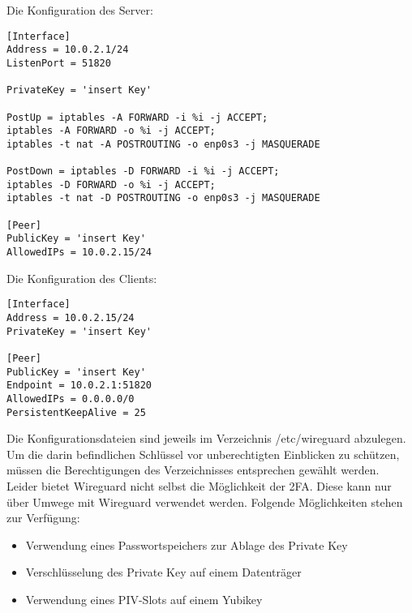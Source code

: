 \noindent Die Konfiguration des Server:
\begin{verbatim}
[Interface]
Address = 10.0.2.1/24
ListenPort = 51820

PrivateKey = 'insert Key'

PostUp = iptables -A FORWARD -i %i -j ACCEPT; 
iptables -A FORWARD -o %i -j ACCEPT; 
iptables -t nat -A POSTROUTING -o enp0s3 -j MASQUERADE

PostDown = iptables -D FORWARD -i %i -j ACCEPT; 
iptables -D FORWARD -o %i -j ACCEPT; 
iptables -t nat -D POSTROUTING -o enp0s3 -j MASQUERADE

[Peer]  
PublicKey = 'insert Key'
AllowedIPs = 10.0.2.15/24
\end{verbatim}
\vspace{0.5cm}
\noindent Die Konfiguration des Clients:
\begin{verbatim}
[Interface]
Address = 10.0.2.15/24
PrivateKey = 'insert Key'

[Peer]  
PublicKey = 'insert Key'
Endpoint = 10.0.2.1:51820
AllowedIPs = 0.0.0.0/0
PersistentKeepAlive = 25
\end{verbatim}

\noindent Die Konfigurationsdateien sind jeweils im Verzeichnis /etc/wireguard abzulegen. Um die darin befindlichen Schl\"ussel vor unberechtigten Einblicken zu sch\"utzen, m\"ussen die Berechtigungen des Verzeichnisses entsprechen gew\"ahlt werden. \\

\noindent Leider bietet Wireguard nicht selbst die M\"oglichkeit der \ac{2FA}. Diese kann nur \"uber Umwege mit Wireguard verwendet werden. Folgende M\"oglichkeiten stehen zur Verf\"ugung:
   \begin{itemize}
      \item Verwendung eines Passwortspeichers zur Ablage des Private Key
      \item Verschl\"usselung des Private Key auf einem Datentr\"ager
			\item Verwendung eines PIV-Slots auf einem Yubikey
   \end{itemize}

